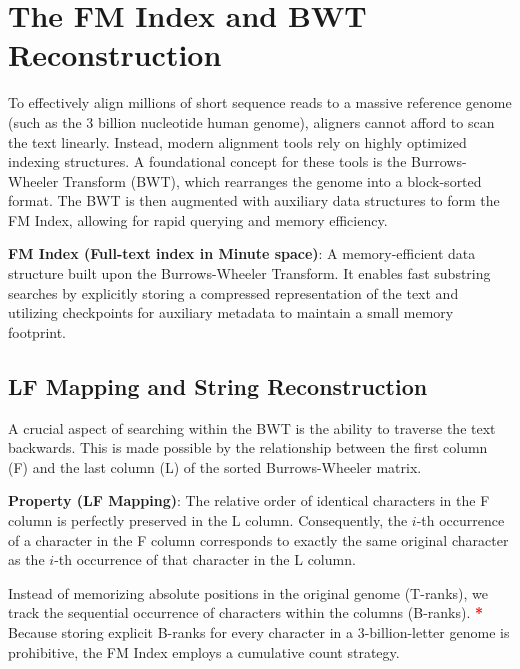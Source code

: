 \documentclass{article}
\newcommand{\sta}{\textbf{\textcolor{red}{* }}}
\begin{document}

\section{The FM Index and BWT Reconstruction}
To effectively align millions of short sequence reads to a massive reference genome (such as the 3 billion nucleotide human genome), aligners cannot afford to scan the text linearly. Instead, modern alignment tools rely on highly optimized indexing structures. A foundational concept for these tools is the Burrows-Wheeler Transform (BWT), which rearranges the genome into a block-sorted format. The BWT is then augmented with auxiliary data structures to form the FM Index, allowing for rapid querying and memory efficiency.

\begin{important}
    \textbf{FM Index (Full-text index in Minute space)}: A memory-efficient data structure built upon the Burrows-Wheeler Transform. It enables fast substring searches by explicitly storing a compressed representation of the text and utilizing checkpoints for auxiliary metadata to maintain a small memory footprint.
\end{important}

\subsection{LF Mapping and String Reconstruction}
A crucial aspect of searching within the BWT is the ability to traverse the text backwards. This is made possible by the relationship between the first column (F) and the last column (L) of the sorted Burrows-Wheeler matrix.

\begin{important}
    \textbf{Property (LF Mapping)}: The relative order of identical characters in the F column is perfectly preserved in the L column. Consequently, the $i$-th occurrence of a character in the F column corresponds to exactly the same original character as the $i$-th occurrence of that character in the L column.
\end{important}

Instead of memorizing absolute positions in the original genome (T-ranks), we track the sequential occurrence of characters within the columns (B-ranks). \sta Because storing explicit B-ranks for every character in a 3-billion-letter genome is prohibitive, the FM Index employs a cumulative count strategy. 
\end{document}

